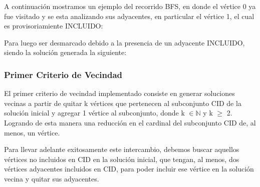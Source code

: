 A continuación mostramos un ejemplo del recorrido BFS, en donde el vértice 0 ya fue visitado y se esta analizando sus adyacentes, en particular el vértice 1, el cual es provisoriamiente INCLUIDO:
\medskip


Para luego ser desmarcado debido a la presencia de un adyacente INCLUIDO, siendo la solución generada la siguiente:
\medskip




\subsubsection{Primer Criterio de Vecindad}

El primer criterio de vecindad implementado consiste en generar soluciones vecinas a partir de quitar k vértices que pertenecen al subconjunto CID de la solución inicial y agregar 1 vértice al subconjunto, donde k $\in \mathbb{N}$ y k $\geq$ 2. Logrando de esta manera una reducción en el cardinal del subconjunto CID de, al menos, un vértice.

Para llevar adelante exitosamente este intercambio, debemos buscar aquellos vértices no incluidos en CID en la solución inicial, que tengan, al menos, dos vértices adyacentes incluidos en CID, para poder incluir ese vértice en la solución vecina y quitar sus adyacentes.

